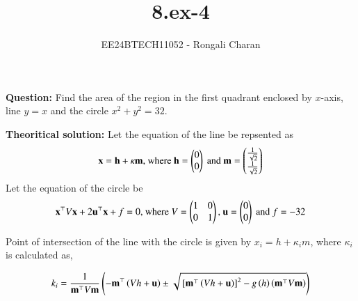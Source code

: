 \documentclass[journal]{IEEEtran}
\begin{document}

\vspace{3cm}

\title{8.ex-4}
\author{EE24BTECH11052 - Rongali Charan}
{\let\newpage\relax\maketitle}

\renewcommand{\thefigure}{\theenumi}
\renewcommand{\thetable}{\theenumi}
\setlength{\intextsep}{10pt} %

\textbf{Question:}
\newline
Find the area of the region in the first quadrant enclosed by $x$-axis, line $y=x$ and the circle $x^2 + y^2 = 32$.

\textbf{Theoritical solution:}
\newline
Let the equation of the line be repsented as
\begin{align}
	\mathbf{x} = \mathbf{h} + \kappa \mathbf{m} \text{, where } \mathbf{h} = \begin{pmatrix}0\\0\end{pmatrix} \text{ and } \mathbf{m} = \begin{pmatrix}\frac{1}{\sqrt{2}} \\ \frac{1}{\sqrt{2}}\end{pmatrix}
\end{align}
Let the equation of the circle be 
\begin{align}
    \mathbf{x}^{\top} V \mathbf{x} + 2\mathbf{u}^{\top}\mathbf{x} + f = 0 \text{, where } V = \begin{pmatrix}1 & 0\\0 & 1\end{pmatrix} \text{, } \mathbf{u} = \begin{pmatrix}0\\0\end{pmatrix} \text{ and } f = - 32
\end{align}

Point of intersection of the line with the circle is given by $x_i = h + \kappa_im$, where $\kappa_i$ is calculated as,

\begin{align}
    k_i=\frac{1}{\mathbf{m}^\top V \mathbf{m}}\left(-\mathbf{m}^\top \left(Vh+\mathbf{u}\right)\pm \sqrt{{}\left[\mathbf{m}^\top \left(Vh+\mathbf{u}\right)\right]^2-g\left(h\right)\left(\mathbf{m}^\top V \mathbf{m}\right)}\right)
\end{align}
\end{document}
